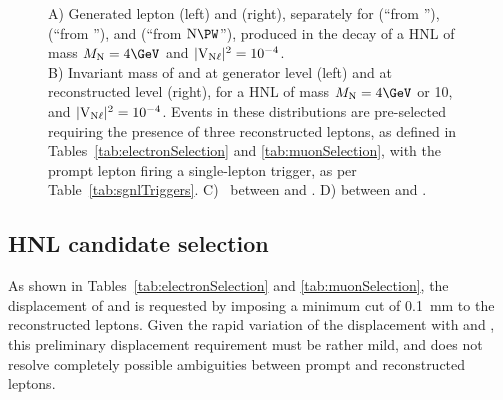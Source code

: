 \begin{figure}[h]
{}
  \caption{A) Generated lepton \pt (left) and \sigeta (right), separately
    for \lone (``from \PW''), \ltwo (``from \hnl''), and \lthree
    (``from $\hnl\PW$''), produced in the decay of a HNL of mass
    $\mhnl=4\GeV$ and $\mathrm{|V_{\mathrm{N}\ell}|^2}=10^{-4}$.\\
B) Invariant mass of \ltwo
    and \lthree 
    at generator level (left) and at reconstructed level (right), for
    a HNL of mass $\mhnl=4\GeV$ or 10\GeV, and $\mathrm{|V_{\mathrm{N}\ell}|^2}=10^{-4}$.
    Events in these distributions are pre-selected requiring the
    presence of three reconstructed leptons, as defined in
    Tables~\ref{tab:electronSelection} and \ref{tab:muonSelection},
    with the prompt lepton firing a single-lepton trigger, as per
    Table~\ref{tab:sgnlTriggers}.
C) \DR\ between \ltwo 
    and \lthree.
D) \Dphi between \lone
    and \lthree.}
  \label{fig:llfeatures}
\end{figure}

\subsection{HNL candidate selection}
As shown in Tables~\ref{tab:electronSelection} and
\ref{tab:muonSelection},
the displacement of \ltwo and \lthree is requested by imposing a
minimum \absdxy cut of 0.1~mm to the reconstructed leptons.
Given the rapid variation of the \hnl displacement with \mhnl and
\mixpar, this preliminary displacement requirement must be rather
mild, and does not resolve completely possible ambiguities between
prompt and \displ reconstructed leptons.

